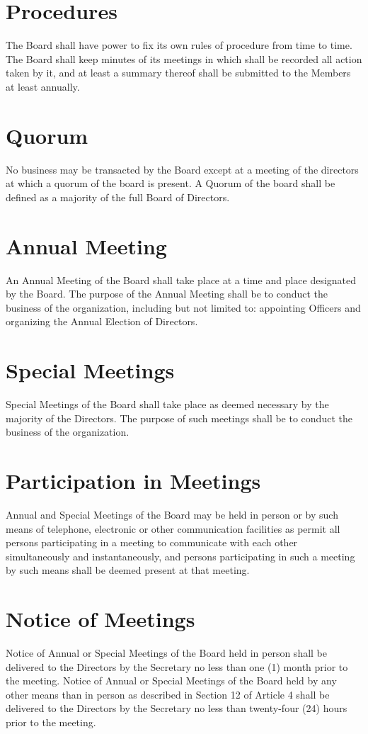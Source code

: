 \documentclass[10pt, english]{bylaws}
\begin{document}
\section{Procedures}
The Board shall have power to fix its own rules of procedure from time to time.
The Board shall keep minutes of its meetings in which shall be recorded all
action taken by it, and at least a summary thereof shall be submitted to the
Members at least annually.

\section{Quorum}
No business may be transacted by the Board except at a meeting of the directors
at which a quorum of the board is present. A Quorum of the board shall be
defined as a majority of the full Board of Directors.

\section{Annual Meeting}
An Annual Meeting of the Board shall take place at a time and place designated
by the Board.  The purpose of the Annual Meeting shall be to conduct the
business of the organization, including but not limited to: appointing Officers
and organizing the Annual Election of Directors.

\section{Special Meetings}
Special Meetings of the Board shall take place as deemed necessary by the
majority of the Directors.  The purpose of such meetings shall be to conduct
the business of the organization.

\section{Participation in Meetings}
Annual and Special Meetings of the Board may be held in person or by such means
of telephone, electronic or other communication facilities as permit all persons
participating in a meeting to communicate with each other simultaneously and
instantaneously, and persons participating in such a meeting by such means shall
be deemed present at that meeting.

\section{Notice of Meetings}
Notice of Annual or Special Meetings of the Board held in person shall be
delivered to the Directors by the Secretary no less than one (1) month prior to
the meeting.  Notice of Annual or Special Meetings of the Board held by any
other means than in person as described in Section 12 of Article 4 shall be
delivered to the Directors by the Secretary no less than twenty-four (24) hours
prior to the meeting.
\end{document}
